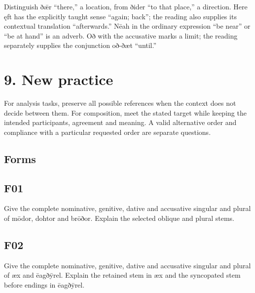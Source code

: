 Distinguish ðǣr “there,” a location, from ðider “to that place,” a direction. Here ęft has the explicitly taught sense “again; back”; the reading also supplies its contextual translation “afterwards.” Nēah in the ordinary expression “be near” or “be at hand” is an adverb. Oð with the accusative marks a limit; the reading separately supplies the conjunction oð-ðæt “until.”

\section*{9. New practice}

For analysis tasks, preserve all possible references when the context does not decide between them. For composition, meet the stated target while keeping the intended participants, agreement and meaning. A valid alternative order and compliance with a particular requested order are separate questions.

\subsection*{Forms}

\par\begin{minipage}{\linewidth}\raggedright
\subsection*{F01}

Give the complete nominative, genitive, dative and accusative singular and plural of mōdor, dohtor and brōðor. Explain the selected oblique and plural stems.

\end{minipage}\par\addvspace{4pt}

\par\begin{minipage}{\linewidth}\raggedright
\subsection*{F02}

Give the complete nominative, genitive, dative and accusative singular and plural of æx and ēagðȳrel. Explain the retained stem in æx and the syncopated stem before endings in ēagðȳrel.

\end{minipage}\par\addvspace{4pt}

